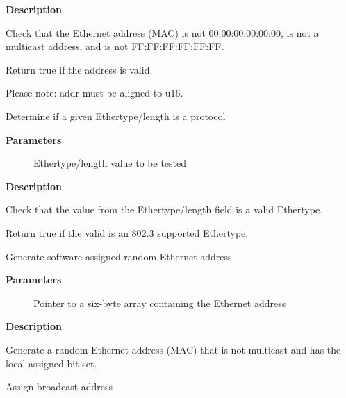 \documentclass[a4paper,8pt,english]{sphinxmanual}
\begin{document}
\textbf{Description}

Check that the Ethernet address (MAC) is not 00:00:00:00:00:00, is not
a multicast address, and is not FF:FF:FF:FF:FF:FF.

Return true if the address is valid.

Please note: addr must be aligned to u16.

\begin{fulllineitems}
\label{networking/kapi:c.eth_proto_is_802_3}
Determine if a given Ethertype/length is a protocol

\end{fulllineitems}


\textbf{Parameters}
\begin{description}
\item[{}] \leavevmode
Ethertype/length value to be tested

\end{description}

\textbf{Description}

Check that the value from the Ethertype/length field is a valid Ethertype.

Return true if the valid is an 802.3 supported Ethertype.

\begin{fulllineitems}
\label{networking/kapi:c.eth_random_addr}
Generate software assigned random Ethernet address

\end{fulllineitems}


\textbf{Parameters}
\begin{description}
\item[{}] \leavevmode
Pointer to a six-byte array containing the Ethernet address

\end{description}

\textbf{Description}

Generate a random Ethernet address (MAC) that is not multicast
and has the local assigned bit set.

\begin{fulllineitems}
\label{networking/kapi:c.eth_broadcast_addr}
Assign broadcast address

\end{fulllineitems}
\end{document}
